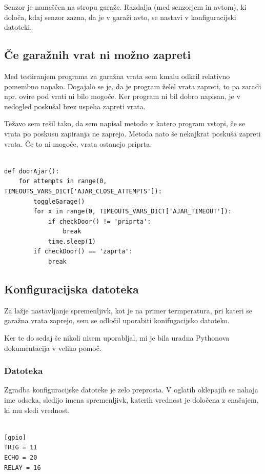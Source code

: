 \documentclass[11pt]{article}
\begin{document}
Senzor je nameščen na stropu garaže. Razdalja (med senzorjem in avtom), ki določa, kdaj senzor zazna, da je v garaži avto, se nastavi v konfiguracijski datoteki.

\subsection{Če garažnih vrat ni možno zapreti}
Med testiranjem programa za garažna vrata sem kmalu odkril relativno pomembno napako. Dogajalo se je, da je program želel vrata zapreti, to pa zaradi npr. ovire pod vrati ni bilo mogoče. Ker program ni bil dobro napisan, je v nedogled poskušal brez uspeha zapreti vrata.

Težavo sem rešil tako, da sem napisal metodo v katero program vstopi, če se vrata po poskusu zapiranja ne zaprejo. Metoda nato še nekajkrat poskuša zapreti vrata. Če to ni mogoče, vrata ostanejo priprta.

\begin{verbatim}

def doorAjar():
    for attempts in range(0, TIMEOUTS_VARS_DICT['AJAR_CLOSE_ATTEMPTS']):
        toggleGarage()
        for x in range(0, TIMEOUTS_VARS_DICT['AJAR_TIMEOUT']):
            if checkDoor() != 'priprta':
                break
            time.sleep(1)
        if checkDoor() == 'zaprta':
            break
\end{verbatim}

\subsection{Konfiguracijska datoteka}
Za lažje nastavljanje spremenljivk, kot je na primer termperatura, pri kateri se garažna vrata zaprejo, sem se odločil uporabiti konifugacijsko datoteko.

Ker te do sedaj še nikoli nisem uporabljal, mi je bila uradna Pythonova dokumentacija \cite{Py_configParser} v veliko pomoč.

\subsubsection{Datoteka}
Zgradba konfiguracijske datoteke je zelo preprosta. V oglatih oklepajih se nahaja ime odseka, sledijo imena spremenljivk, katerih vrednost je določena z enačajem, ki mu sledi vrednost.
\begin{verbatim}

[gpio]
TRIG = 11
ECHO = 20
RELAY = 16
\end{verbatim}
\end{document}
